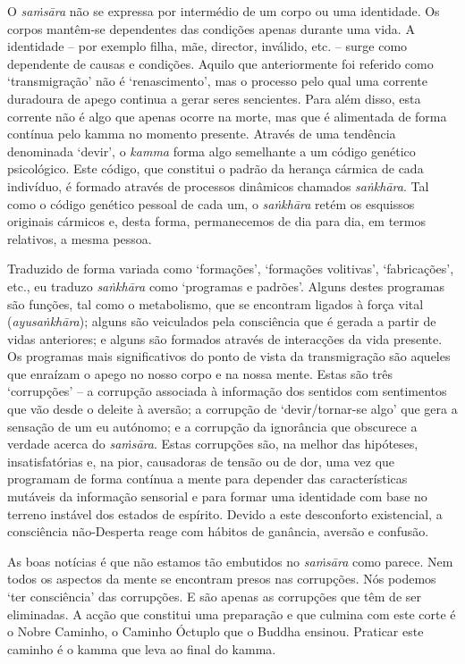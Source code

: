 O \emph{saṁsāra} não se expressa por intermédio de um corpo ou uma identidade.
Os corpos mantêm-se dependentes das condições apenas durante uma vida. A
identidade -- por exemplo filha, mãe, director, inválido, etc. -- surge como
dependente de causas e condições. Aquilo que anteriormente foi referido como
`transmigração' não é `renascimento', mas o processo pelo qual uma corrente
duradoura de apego continua a gerar seres sencientes. Para além disso, esta
corrente não é algo que apenas ocorre na morte, mas que é alimentada de forma
contínua pelo kamma no momento presente. Através de uma tendência denominada
`devir', o \emph{kamma} forma algo semelhante a um código genético psicológico.
Este código, que constitui o padrão da herança cármica de cada indivíduo, é
formado através de processos dinâmicos chamados \emph{saṅkhāra}. Tal como o
código genético pessoal de cada um, o \emph{saṅkhāra} retém os esquissos
originais cármicos e, desta forma, permanecemos de dia para dia, em termos
relativos, a mesma pessoa.

Traduzido de forma variada como `formações', `formações volitivas',
`fabricações', etc., eu traduzo \emph{saṅkhāra} como `programas e padrões'.
Alguns destes programas são funções, tal como o metabolismo, que se encontram
ligados à força vital (\emph{ayusaṅkhāra}); alguns são veiculados pela
consciência que é gerada a partir de vidas anteriores; e alguns são formados
através de interacções da vida presente. Os programas mais significativos do
ponto de vista da transmigração são aqueles que enraízam o apego no nosso corpo
e na nossa mente. Estas são três `corrupções' -- a corrupção associada à
informação dos sentidos com sentimentos que vão desde o deleite à aversão; a
corrupção de `devir/tornar-se algo' que gera a sensação de um eu autónomo; e a
corrupção da ignorância que obscurece a verdade acerca do \emph{saṁsāra}. Estas
corrupções são, na melhor das hipóteses, insatisfatórias e, na pior, causadoras
de tensão ou de dor, uma vez que programam de forma contínua a mente para
depender das características mutáveis da informação sensorial e para formar uma
identidade com base no terreno instável dos estados de espírito. Devido a este
desconforto existencial, a consciência não-Desperta reage com hábitos de
ganância, aversão e confusão.

As boas notícias é que não estamos tão embutidos no \emph{saṁsāra} como parece.
Nem todos os aspectos da mente se encontram presos nas corrupções. Nós podemos
`ter consciência' das corrupções. E são apenas as corrupções que têm de ser
eliminadas. A acção que constitui uma preparação e que culmina com este corte é
o Nobre Caminho, o Caminho Óctuplo que o Buddha ensinou. Praticar este caminho é
o kamma que leva ao final do kamma.

